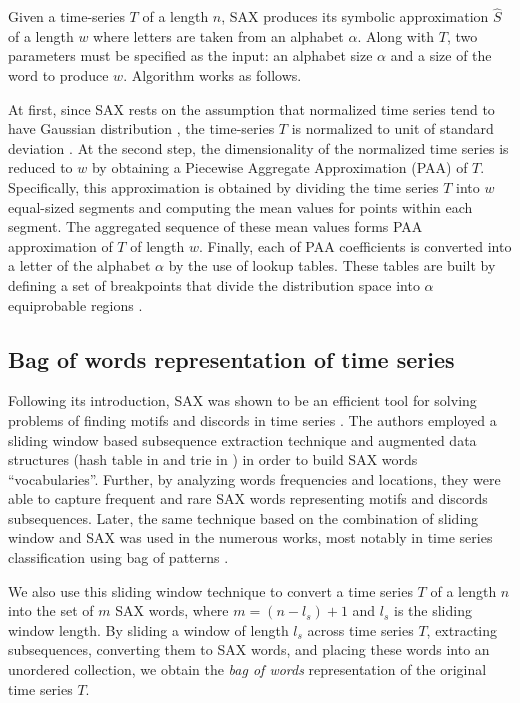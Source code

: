 \documentclass{llncs}
\begin{document}
Given a time-series $T$ of a length $n$, SAX produces its symbolic approximation $\hat{S}$ of 
a length $w$ where letters are taken from an alphabet $\alpha$. 
Along with $T$, two parameters must be specified as the input: an alphabet size $\alpha$ and 
a size of the word to produce $w$. Algorithm works as follows. 

At first, since SAX rests on the assumption that normalized time series tend to have Gaussian 
distribution \cite{larsen_marx}, the time-series $T$ is normalized to unit of standard deviation
\cite{goldin_kanellakis}. 
At the second step, the dimensionality of the normalized time series is reduced to $w$ by 
obtaining a Piecewise Aggregate Approximation (PAA) of $T$. 
Specifically, this approximation is obtained by dividing the time series $T$ into $w$ 
equal-sized segments and computing the mean values for points within each segment. 
The aggregated sequence of these mean values forms PAA approximation of $T$ of length $w$.
Finally, each of PAA coefficients is converted into a letter of the alphabet $\alpha$ by the use 
of lookup tables. These tables are built by defining a set of breakpoints that divide the 
distribution space into $\alpha$ equiprobable regions \cite{sax}.

\subsection{Bag of words representation of time series} \label{bow_representation}
Following its introduction, SAX was shown to be an efficient tool for solving problems 
of finding motifs and discords in time series \cite{motifs, hot_sax}. 
The authors employed a sliding window based subsequence extraction technique 
and augmented data structures (hash table in \cite{motifs} and trie in \cite{hot_sax}) 
in order to build SAX words ``vocabularies''. Further, by analyzing words frequencies 
and locations, they were able to capture frequent and rare SAX words representing 
motifs and discords subsequences. Later, the same technique based on the combination 
of sliding window and SAX was used in the numerous works, most notably in time series 
classification using bag of patterns \cite{bag_patterns}. 

We also use this sliding window technique to convert a time series $T$ of a length $n$ into 
the set of $m$ SAX words, where $m=(n-l_{s})+1$ and $l_{s}$ is the sliding window length. 
By sliding a window of length $l_{s}$ across time series $T$, extracting subsequences, 
converting them to SAX words, and placing these words into an unordered collection, 
we obtain the \textit{bag of words} representation of the original time series $T$.
\end{document}
